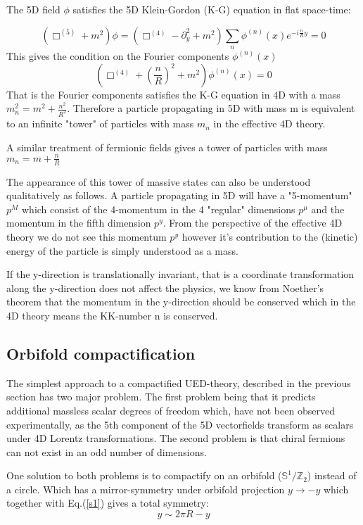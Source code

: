 \documentclass{article}
\begin{document}
The 5D field $\phi$ satisfies the 5D Klein-Gordon (K-G) equation in flat space-time: 
  
\begin{equation}
    (\Box^{(5)}+m^2)\phi=(\Box^{(4)}-\partial_y^2+m^2)\sum_n \phi^{(n)}(x)e^{-i\frac{n}{R}y}=0
\end{equation} 
 This gives the condition on the Fourier components $\phi^{(n)}(x)$ 
 \begin{equation}
   (\Box^{(4)}+(\frac{n}{R})^2+m^2) \phi^{(n)}(x)=0
\end{equation} 
That is the Fourier components satisfies the K-G equation in 4D with a mass $m_n^2=m^2+\frac{n^2}{R^2}$. Therefore a particle propagating in 5D with mass m is equivalent to an infinite "tower" of particles with mass $m_n$ in the effective 4D theory. 

A similar treatment of fermionic fields gives a tower of particles with mass $m_n=m+\frac{n}{R}$ 

The appearance of this tower of massive states can also be understood qualitatively as follows. A particle propagating in 5D will have a  "5-momentum" $p^M$ which consist of the 4-momentum in the 4 "regular" dimensions $p^\mu$ and the momentum in the fifth dimension $p^y$. From the perspective of the effective 4D theory we do not see this momentum $p^y$ however it's contribution to the (kinetic) energy of the particle is simply understood as a mass.

If the y-direction is translationally invariant, that is a coordinate transformation along the y-direction does not affect the physics, we know from Noether's theorem that the momentum in the y-direction should be conserved which in the 4D theory means the KK-number n is conserved.



\subsection{Orbifold compactification}
The simplest approach to a compactified UED-theory, described in the previous section has two major problem.
The first problem being that it predicts additional massless scalar degrees of freedom which, have not been observed experimentally, as the 5th component of the 5D vectorfields transform as scalars under 4D Lorentz transformations. 
The second problem is that chiral fermions can not exist in an odd number of dimensions.  

One solution to both problems is to compactify on an orbifold ($\mathbb{S}^1/\mathbb{Z}_2$) instead of a circle. Which has a mirror-symmetry under orbifold projection $y\rightarrow -y$ which together with Eq.(\ref{s1}) gives a total symmetry:
\begin{equation}
    y\sim 2\pi R-y
\end{equation}
\end{document}
